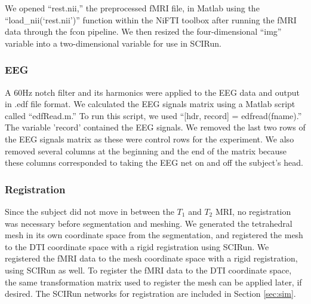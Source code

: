 We opened ``rest.nii,'' the preprocessed fMRI file, in Matlab using the ``load\_nii(`rest.nii')'' function within the NiFTI toolbox \cite{ref:nifti} after running the fMRI data through the fcon pipeline. We then resized the four-dimensional ``img'' variable into a two-dimensional variable for use in SCIRun.

\subsubsection{EEG}

A 60Hz notch filter and its harmonics \cite{ref:filter} were applied to the EEG data and output in .edf file format. We calculated the EEG signals matrix using a Matlab script called ``edfRead.m.'' \cite{ref:edfread} To run this script, we used ``[hdr, record] = edfread(fname).'' The variable 'record' contained the EEG signals. We removed the last two rows of the EEG signals matrix as these were control rows for the experiment. We also removed several columns at the beginning and the end of the matrix because these columns corresponded to taking the EEG net on and off the subject's head.

\subsubsection{Registration}

Since the subject did not move in between the $T_1$ and $T_2$ MRI, no registration was necessary before segmentation and meshing. We generated the tetrahedral mesh in its own coordinate space from the segmentation, and registered the mesh to the DTI coordinate space with a rigid registration using SCIRun. We registered the fMRI data to the mesh coordinate space with a rigid registration, using SCIRun as well. To register the fMRI data to the DTI coordinate space, the same transformation matrix used to register the mesh can be applied later, if desired. The SCIRun networks for registration are included in Section \ref{sec:sim}.

